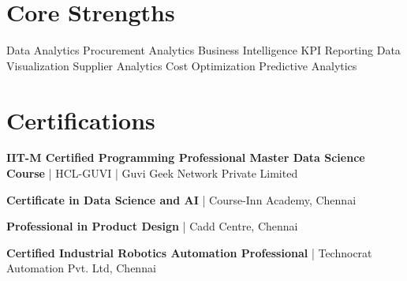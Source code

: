 \documentclass[]{deedy-resume-reversed}
\begin{document}
\begin{minipage}[t]{0.30\textwidth}
\section{Core Strengths}

\textbullet{} Data Analytics \textbullet{} Procurement Analytics \textbullet{} Business Intelligence \textbullet{} KPI Reporting \textbullet{} Data Visualization \textbullet{} Supplier Analytics \textbullet{} Cost Optimization \textbullet{} Predictive Analytics

\sectionsep


\section{Certifications}

\textbullet{} \textbf{IIT-M Certified Programming Professional Master Data Science Course} | HCL-GUVI | Guvi Geek Network Private Limited

\textbullet{} \textbf{Certificate in Data Science and AI} | Course-Inn Academy, Chennai

\textbullet{} \textbf{Professional in Product Design} | Cadd Centre, Chennai

\textbullet{} \textbf{Certified Industrial Robotics Automation Professional} |  Technocrat Automation Pvt. Ltd, Chennai

\sectionsep


\end{minipage}
\end{document}
